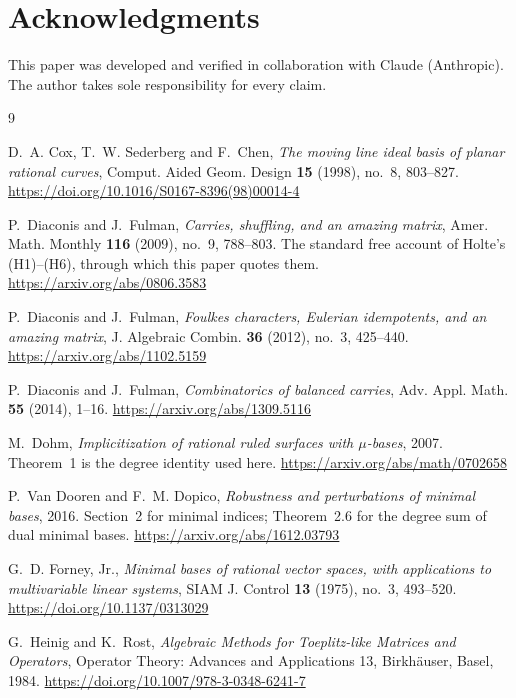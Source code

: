 \documentclass[11pt]{amsart}
\theoremstyle{definition}
\theoremstyle{remark}
\begin{document}

\section*{Acknowledgments}

This paper was developed and verified in collaboration with Claude (Anthropic). The author takes sole responsibility for every claim.


\begin{thebibliography}{9}

D.~A. Cox, T.~W. Sederberg and F.~Chen, \emph{The moving line ideal basis of planar rational curves}, Comput. Aided Geom. Design \textbf{15} (1998), no.~8, 803--827. \url{https://doi.org/10.1016/S0167-8396(98)00014-4}

P.~Diaconis and J.~Fulman, \emph{Carries, shuffling, and an amazing matrix}, Amer. Math. Monthly \textbf{116} (2009), no.~9, 788--803. The standard free account of Holte's (H1)--(H6), through which this paper quotes them. \url{https://arxiv.org/abs/0806.3583}

P.~Diaconis and J.~Fulman, \emph{Foulkes characters, Eulerian idempotents, and an amazing matrix}, J. Algebraic Combin. \textbf{36} (2012), no.~3, 425--440. \url{https://arxiv.org/abs/1102.5159}

P.~Diaconis and J.~Fulman, \emph{Combinatorics of balanced carries}, Adv. Appl. Math. \textbf{55} (2014), 1--16. \url{https://arxiv.org/abs/1309.5116}

M.~Dohm, \emph{Implicitization of rational ruled surfaces with $\mu$-bases}, 2007. Theorem~1 is the degree identity used here. \url{https://arxiv.org/abs/math/0702658}

P.~Van Dooren and F.~M. Dopico, \emph{Robustness and perturbations of minimal bases}, 2016. Section~2 for minimal indices; Theorem~2.6 for the degree sum of dual minimal bases. \url{https://arxiv.org/abs/1612.03793}

G.~D. Forney, Jr., \emph{Minimal bases of rational vector spaces, with applications to multivariable linear systems}, SIAM J. Control \textbf{13} (1975), no.~3, 493--520. \url{https://doi.org/10.1137/0313029}

G.~Heinig and K.~Rost, \emph{Algebraic Methods for Toeplitz-like Matrices and Operators}, Operator Theory: Advances and Applications 13, Birkh\"auser, Basel, 1984. \url{https://doi.org/10.1007/978-3-0348-6241-7}


\end{thebibliography}
\end{document}
